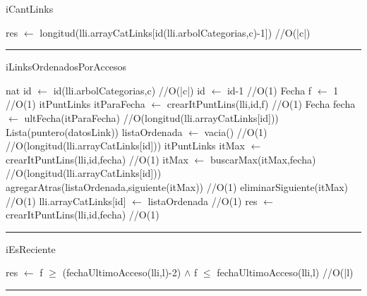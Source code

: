 \begin{algorithm}[H]
\caption{iCantLinks}
\begin{algorithmic}[1]
\state res $\gets$ longitud(lli.arrayCatLinks[id(lli.arbolCategorias,c)-1]) \hfill //O(|c|)
\EndFunction 
\end{algorithmic}
\hrule
{}
\end{algorithm}

\begin{algorithm}[H]
\caption{iLinksOrdenadosPorAccesos}
\begin{algorithmic}[1]
\state nat id $\gets$ id(lli.arbolCategorias,c) \hfill//O(|c|)
\state id $\gets$ id-1 \hfill //O(1)
\state Fecha f $\gets$ 1 \hfill //O(1)
\state itPuntLinks itParaFecha $\gets$ crearItPuntLins(lli,id,f) \hfill //O(1)
\state Fecha fecha $\gets$ ultFecha(itParaFecha) \hfill //O(longitud(lli.arrayCatLinks[id]))
\state Lista(puntero(datosLink)) listaOrdenada $\gets$ vacia() \hfill//O(1)
\state\hfill //O(longitud(lli.arrayCatLinks[id]))
\state itPuntLinks itMax $\gets$ crearItPuntLins(lli,id,fecha) \hfill //O(1)
\state itMax $\gets$ buscarMax(itMax,fecha) \hfill //O(longitud(lli.arrayCatLinks[id]))
\state agregarAtras(listaOrdenada,siguiente(itMax)) \hfill //O(1)
\state eliminarSiguiente(itMax) \hfill //O(1)
\endwhile
\state lli.arrayCatLinks[id] $\gets$ listaOrdenada \hfill //O(1)
\endif
\state res $\gets$ crearItPuntLins(lli,id,fecha) \hfill //O(1)
\EndFunction 
\end{algorithmic}
\hrule
{}
\end{algorithm}

\begin{algorithm}[H]
\caption{iEsReciente}
\begin{algorithmic}[1]
\state res $\gets$ f $\geq$ (fechaUltimoAcceso(lli,l)-2) $\land$ f $\leq$ fechaUltimoAcceso(lli,l) \hfill//O(|l)
\EndFunction 
\end{algorithmic}
\hrule
{}
\end{algorithm}

